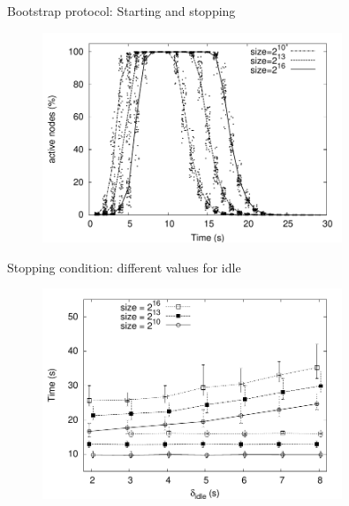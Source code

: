 \begin{frame}{Bootstrap protocol: Starting and stopping}
	
\begin{figure}
	\includegraphics[width=0.80\textwidth]{figs/11/sort-active}
\end{figure}	
	
\end{frame}

\begin{frame}{Stopping condition: different values for idle}
	
\begin{figure}
	\includegraphics[width=0.80\textwidth]{figs/11/sort-inactive-time}
\end{figure}	
	
\end{frame}

